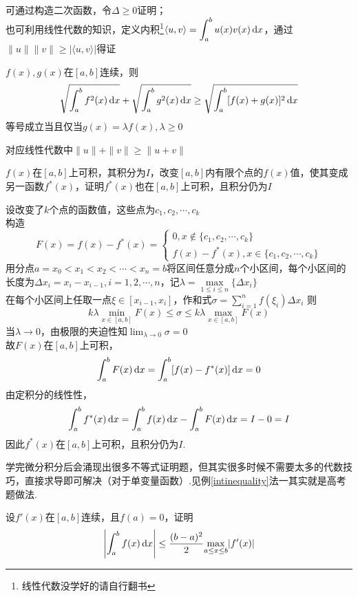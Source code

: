 \begin{analysis}
可通过构造二次函数，令$\Delta\geq0$证明；\\
也可利用线性代数的知识，定义内积\footnote{线性代数没学好的请自行翻书}$\displaystyle	\langle u,v\rangle=\int_a^bu(x)v(x)\,\mathrm{d} x$，通过$\|u\|\|v\|\geq|\langle u,v\rangle|$得证
\end{analysis}
\begin{theorem}
$f(x),g(x)$在$[a,b]$连续，则
\[\sqrt{\int_a^bf^2(x)\,\mathrm{d} x} + \sqrt{\int_a^bg^2(x)\,\mathrm{d} x}\geq\sqrt{\int_a^b[f(x)+g(x)]^2\,\mathrm{d} x}\]
等号成立当且仅当$g(x)=\lambda f(x),\lambda\geq 0$
\end{theorem}
\begin{analysis}
对应线性代数中$\|u\|+\|v\|\geq\|u+v\|$
\end{analysis}
\begin{example}
$f(x)$在$[a,b]$上可积，其积分为$I$，改变$[a,b]$内有限个点的$f(x)$值，使其变成另一函数$f^*(x)$，证明$f^*(x)$也在$[a,b]$上可积，且积分仍为$I$
\end{example}
\begin{analysis}
设改变了$k$个点的函数值，这些点为$c_1,c_2,\cdots,c_k$\\
构造
\[F(x)=f(x)-f^*(x)=\begin{cases}
0,x\notin\{c_1,c_2,\cdots,c_k\}\\
f(x)-f^*(x),x\in\{c_1,c_2,\cdots,c_k\}
\end{cases}\]
用分点$a=x_0<x_1<x_2<\cdots<x_n=b$将区间任意分成$n$个小区间，每个小区间的长度为$\Delta x_i=x_i-x_{i-1},i=1,2,\cdots,n$，记$\lambda = \underset{1\leq i\leq n}{\max}\{\Delta x_i\}$\\
在每个小区间上任取一点$\xi\in[x_{i-1},x_i]$，作和式$\displaystyle\sigma = \sum_{i=1}^{n}f(\xi_i)\Delta x_i$
则
\[k\lambda\underset{x\in[a,b]}{\min}F(x)\leq\sigma\leq k\lambda\underset{x\in[a,b]}{\max}F(x)\]
当$\lambda\to 0$，由极限的夹迫性知$\displaystyle\lim_{\lambda\to 0}\sigma=0$\\
故$F(x)$在$[a,b]$上可积，
\[\int_a^b F(x)\,\mathrm{d} x=\int_a^b[f(x)-f^*(x)]\,\mathrm{d} x=0\]
由定积分的线性性，
\[\int_a^b f^*(x)\,\mathrm{d} x=\int_a^b f(x)\,\mathrm{d} x-\int_a^b F(x)\,\mathrm{d} x=I-0=I\]
因此$f^*(x)$在$[a,b]$上可积，且积分仍为$I$.
\end{analysis}
\par 学完微分积分后会涌现出很多不等式证明题，但其实很多时候不需要太多的代数技巧，直接求导即可解决（对于单变量函数）.见例\ref{intinequality}法一其实就是高考题做法.
\begin{example}
\label{intinequality}
设$f'(x)$在$[a,b]$连续，且$f(a)=0$，证明
\[\left|\int_a^bf(x)\,\mathrm{d} x\right|\leq\frac{(b-a)^2}{2}\underset{a\leq x\leq b}{\max}|f'(x)|\]
\end{example}
